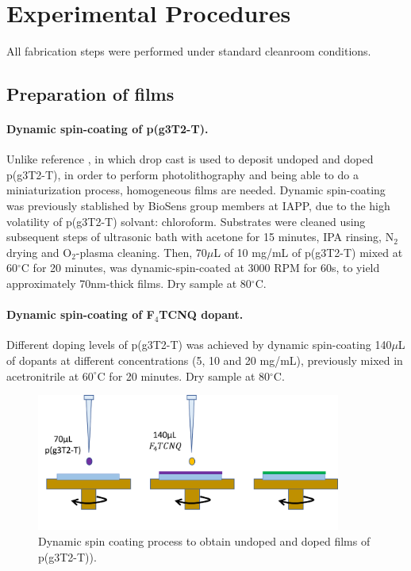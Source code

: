 \section{Experimental Procedures}

All fabrication steps were performed under standard cleanroom conditions.
\subsection{Preparation of films}
\paragraph{Dynamic spin-coating of p(g3T2-T).}Unlike reference \cite{tanTuningOrganicElectrochemical2022}, in which drop cast is used to deposit undoped and doped p(g3T2-T), in order to perform photolithography and being able to do a miniaturization process, homogeneous films are needed. Dynamic spin-coating was previously stablished by BioSens group members at IAPP, due to the high volatility of p(g3T2-T) solvant: chloroform. Substrates were cleaned using subsequent steps of ultrasonic bath with acetone for 15 minutes, IPA rinsing, N$_{2}$ drying and O$_{2}$-plasma cleaning. Then, 70$\mu$L of 10 mg/mL of p(g3T2-T) mixed at 60$^{\circ}$C for 20 minutes, was dynamic-spin-coated at 3000 RPM for 60s, to yield approximately 70nm-thick films. Dry sample at 80$^{\circ}$C.

\paragraph{Dynamic spin-coating of F$_{4}$TCNQ dopant.}Different doping levels of p(g3T2-T) was achieved by dynamic spin-coating 140$\mu$L of dopants at different concentrations (5, 10 and 20 mg/mL), previously mixed in acetronitrile at $60^{\circ}$C for 20 minutes. Dry sample at 80$^{\circ}$C.

\begin{figure}[ht]
  \centering
  \includegraphics[width=10cm]{Images/pdf/spin_coating.pdf}
  \caption{Dynamic spin coating process to obtain undoped and doped films of p(g3T2-T)).}
  \label{fig:coating}
\end{figure}

